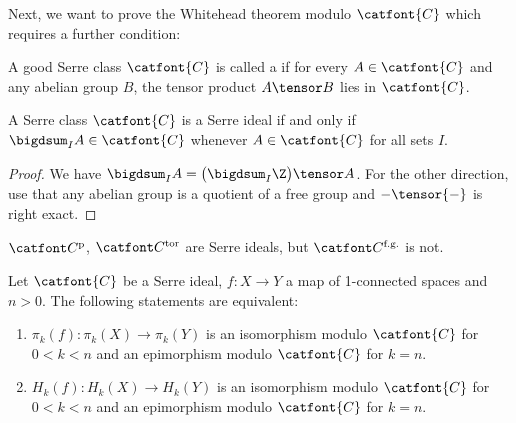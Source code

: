 Next, we want to prove the Whitehead theorem modulo $\catfont{C}$ which requires a further condition:
\begin{definition}
	A good Serre class $\catfont{C}$ is called a  if for every $A \in \catfont{C}$ and any abelian group $B$, the tensor product $A \tensor B$ lies in $\catfont{C}$.
\end{definition}
\begin{lemma}
	A Serre class $\catfont{C}$ is a Serre ideal if and only if $\bigdsum_I A \in \catfont{C}$ whenever $A \in \catfont{C}$ for all sets $I$.
\end{lemma}
\begin{proof}
	We have $\bigdsum_I A = \big(\bigdsum_I \Z\big) \tensor A$.
	For the other direction, use that any abelian group is a quotient of a free group and ${{-}} \tensor {{-}}$ is right exact.
\end{proof}
\begin{example}
	$\Cptor$, $\Ctor$ are Serre ideals, but $\Cfg$ is not.
\end{example}
\begin{theorem}
	Let $\catfont{C}$ be a Serre ideal, $f\colon X \to Y$ a map of 1-connected spaces and $n > 0$.
	The following statements are equivalent:
	\begin{enumerate}
		\item $\pi_k(f)\colon \pi_k(X) \to \pi_k(Y)$ is an isomorphism modulo $\catfont{C}$ for $0 < k < n$ and an epimorphism modulo $\catfont{C}$ for $k = n$.
		\item $H_k(f)\colon H_k(X) \to H_k(Y)$ is an isomorphism modulo $\catfont{C}$ for $0 < k < n$ and an epimorphism modulo $\catfont{C}$ for $k = n$.
	\end{enumerate}
\end{theorem}
